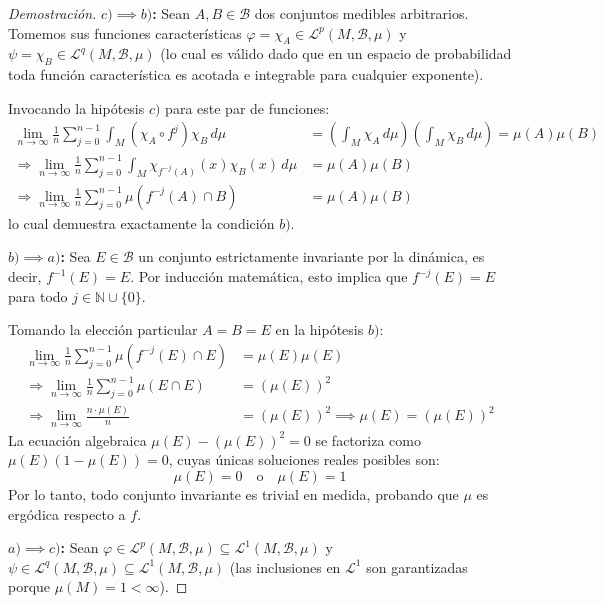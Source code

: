 \begin{proof}[Demostración]
	\textbf{$c) \implies b)$:}
	Sean $A, B \in \mathcal{B}$ dos conjuntos medibles arbitrarios. Tomemos sus funciones características $\varphi = \chi_A \in \mathcal{L}^p(M, \mathcal{B}, \mu)$ y $\psi = \chi_B \in \mathcal{L}^q(M, \mathcal{B}, \mu)$ (lo cual es válido dado que en un espacio de probabilidad toda función característica es acotada e integrable para cualquier exponente).
	
	Invocando la hipótesis $c)$ para este par de funciones:
	\begin{align*}
		\lim_{n \to \infty} \frac{1}{n} \sum_{j=0}^{n-1} \int_M (\chi_A \circ f^j)\chi_B \, d\mu &= \left( \int_M \chi_A \, d\mu \right) \left( \int_M \chi_B \, d\mu \right) = \mu(A)\mu(B) \\
		\Longrightarrow \lim_{n \to \infty} \frac{1}{n} \sum_{j=0}^{n-1} \int_M \chi_{f^{-j}(A)}(x)\chi_B(x) \, d\mu &= \mu(A)\mu(B) \\
		\Longrightarrow \lim_{n \to \infty} \frac{1}{n} \sum_{j=0}^{n-1} \mu(f^{-j}(A) \cap B) &= \mu(A)\mu(B)
	\end{align*}
	lo cual demuestra exactamente la condición $b)$.
	
	\textbf{$b) \implies a)$:}
	Sea $E \in \mathcal{B}$ un conjunto estrictamente invariante por la dinámica, es decir, $f^{-1}(E) = E$. Por inducción matemática, esto implica que $f^{-j}(E) = E$ para todo $j \in \mathbb{N} \cup \{0\}$.
	
	Tomando la elección particular $A = B = E$ en la hipótesis $b)$:
	\begin{align*}
		\lim_{n \to \infty} \frac{1}{n} \sum_{j=0}^{n-1} \mu(f^{-j}(E) \cap E) &= \mu(E)\mu(E) \\
		\Longrightarrow \lim_{n \to \infty} \frac{1}{n} \sum_{j=0}^{n-1} \mu(E \cap E) &= (\mu(E))^2 \\
		\Longrightarrow \lim_{n \to \infty} \frac{n \cdot \mu(E)}{n} &= (\mu(E))^2 \implies \mu(E) = (\mu(E))^2
	\end{align*}
	La ecuación algebraica $\mu(E) - (\mu(E))^2 = 0$ se factoriza como $\mu(E)(1 - \mu(E)) = 0$, cuyas únicas soluciones reales posibles son:
	$$ \mu(E) = 0 \quad \text{o} \quad \mu(E) = 1 $$
	Por lo tanto, todo conjunto invariante es trivial en medida, probando que $\mu$ es ergódica respecto a $f$.
	
	\textbf{$a) \implies c)$:}
	Sean $\varphi \in \mathcal{L}^p(M, \mathcal{B}, \mu) \subseteq \mathcal{L}^1(M, \mathcal{B}, \mu)$ y $\psi \in \mathcal{L}^q(M, \mathcal{B}, \mu) \subseteq \mathcal{L}^1(M, \mathcal{B}, \mu)$ (las inclusiones en $\mathcal{L}^1$ son garantizadas porque $\mu(M) = 1 < \infty$).
	

\end{proof}
